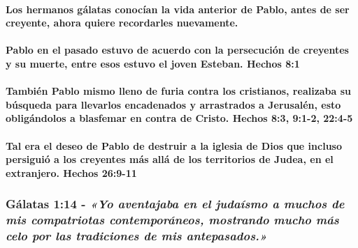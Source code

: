 \documentclass[11a pt,twoside]{article}
\newcommand{\scripture}[1]{%
  {\fontsize{12pt}{16pt}\selectfont\ScriptureFont\itshape #1}%
}
\let\oldsubsubsection\subsubsection
\renewcommand{\subsubsection}{\needspace{4\baselineskip}\oldsubsubsection}
\let\oldparagraph\paragraph
\renewcommand{\paragraph}{\needspace{3\baselineskip}\oldparagraph}
\begin{document}
\paragraph{Los hermanos gálatas conocían la vida anterior de Pablo,
antes de ser creyente, ahora quiere recordarles
nuevamente.}\label{los-hermanos-guxe1latas-conocuxedan-la-vida-anterior-de-pablo-antes-de-ser-creyente-ahora-quiere-recordarles-nuevamente.}

\paragraph{Pablo en el pasado estuvo de acuerdo con la persecución de
creyentes y su muerte, entre esos estuvo el joven Esteban. Hechos
8:1}\label{pablo-en-el-pasado-estuvo-de-acuerdo-con-la-persecuciuxf3n-de-creyentes-y-su-muerte-entre-esos-estuvo-el-joven-esteban.-hechos-81}

\paragraph{También Pablo mismo lleno de furia contra los cristianos,
realizaba su búsqueda para llevarlos encadenados y arrastrados a
Jerusalén, esto obligándolos a blasfemar en contra de Cristo. Hechos
8:3, 9:1-2,
22:4-5}\label{tambiuxe9n-pablo-mismo-lleno-de-furia-contra-los-cristianos-realizaba-su-buxfasqueda-para-llevarlos-encadenados-y-arrastrados-a-jerusaluxe9n-esto-obliguxe1ndolos-a-blasfemar-en-contra-de-cristo.-hechos-83-91-2-224-5}

\paragraph{Tal era el deseo de Pablo de destruir a la iglesia de Dios
que incluso persiguió a los creyentes más allá de los territorios de
Judea, en el extranjero. Hechos
26:9-11}\label{tal-era-el-deseo-de-pablo-de-destruir-a-la-iglesia-de-dios-que-incluso-persiguiuxf3-a-los-creyentes-muxe1s-alluxe1-de-los-territorios-de-judea-en-el-extranjero.-hechos-269-11}

\subsubsection{\texorpdfstring{Gálatas 1:14 -
\scripture{«Yo aventajaba en el judaísmo a muchos de mis compatriotas contemporáneos, mostrando mucho más celo por las tradiciones de mis antepasados.»}}{Gálatas 1:14 - }}\label{guxe1latas-114---yo-aventajaba-en-el-judauxedsmo-a-muchos-de-mis-compatriotas-contemporuxe1neos-mostrando-mucho-muxe1s-celo-por-las-tradiciones-de-mis-antepasados.}
\end{document}
